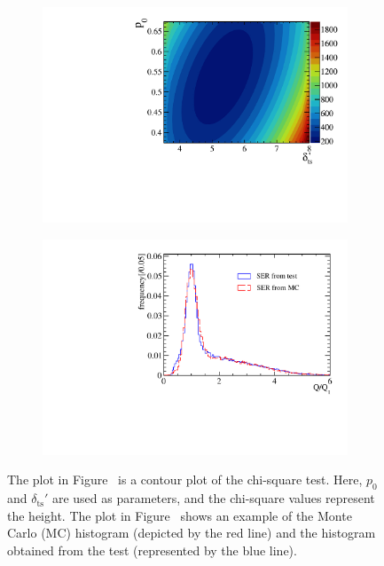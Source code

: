 \begin{figure}[!htbp]
	\centering
	\begin{subfigure}{0.47\textwidth}
		\centering
		\includegraphics[width=\linewidth]{PMTRelated/GTmodel/cour.pdf}
		\caption{}
		\label{fig:cour}
	\end{subfigure}
	\hfill
	\begin{subfigure}{0.47\textwidth}
		\centering
		\includegraphics[width=\linewidth]{PMTRelated/GTmodel/hist.pdf}
		\caption{}
		\label{fig:hist}
	\end{subfigure}
	\caption{The plot in Figure~ is a contour plot of the chi-square test. Here, $p_0$ and $\delta_{\mathrm{ts}}'$ are used as parameters, and the chi-square values represent the height. The plot in Figure~ shows an example of the Monte Carlo (MC) histogram (depicted by the red line) and the histogram obtained from the test (represented by the blue line).
	}
	\label{fig:chi}
\end{figure}

